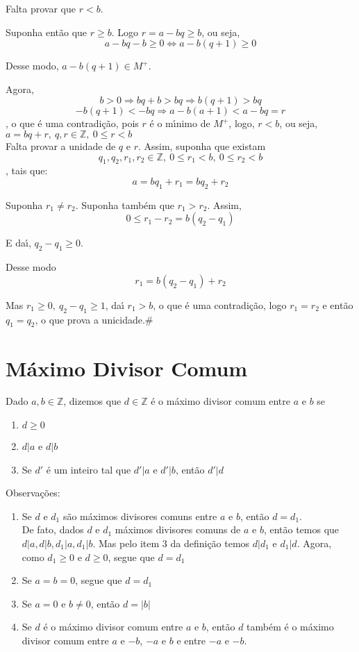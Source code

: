 Falta provar que $r<b$.

Suponha ent{\~a}o que $r\geq b$. Logo $r=a-bq\geq b$, ou seja,\[a-bq-b\geq 0\Leftrightarrow a-b(q+1)\geq 0\]

Desse modo, $a-b(q+1)\in M^{+}$.

Agora, \[b>0\Rightarrow bq+b>bq\Rightarrow b(q+1)>bq\] \[-b(q+1)<-bq\Rightarrow a-b(a+1)<a-bq=r\], o que {\'e} uma contradi{\c c}{\~a}o, pois $r$ {\'e} o m{\'\i}nimo de $M^{+}$, logo, $r<b$, ou seja, $a=bq+r,\ q,r\in\mathbb{Z},\ 0\leq r<b$\\

Falta provar a unidade de $q$ e $r$. Assim, suponha que existam \[q_{1},q_{2},r_{1},r_{2}\in\mathbb{Z},\ 0\leq r_{1}<b,\ 0\leq r_{2}<b\], tais que:
\[a=bq_{1}+r_{1}=bq_{2}+r_{2}\]

Suponha $r_{1}\neq r_{2}$. Suponha tamb{\'e}m que $r_{1}>r_{2}$. Assim, \[0\leq r_{1}-r_{2}=b(q_{2}-q_{1})\]

E da{\'\i}, $q_{2}-q_{1}\geq 0$.

Desse modo \[r_{1}=b(q_{2}-q_{1})+r_{2}\]

Mas $r_{1}\geq 0,\ q_{2}-q_{1}\geq 1$, da{\'\i} $r_{1}>b$, o que {\'e} uma contradi{\c c}{\~a}o, logo $r_{1}=r_{2}$ e ent{\~a}o $q_{1}=q_{2}$, o que prova a unicidade.\#

\section{M{\'a}ximo Divisor Comum}

\begin{definicao} Dado $a,b\in\mathbb{Z}$, dizemos que $d\in\mathbb{Z}$ {\'e} o m{\'a}ximo divisor comum entre $a$ e $b$ se
\begin{enumerate}
\item $d\geq 0$
\item $d|a$ e $d|b$
\item Se $d'$ {\'e} um inteiro tal que $d'|a$ e $d'|b$, ent{\~a}o $d'|d$ %
\end{enumerate}
\end{definicao}

Observa{\c c}{\~o}es:
\begin{enumerate}
\item Se $d$ e $d_{1}$ s{\~a}o m{\'a}ximos divisores comuns entre $a$ e $b$, ent{\~a}o $d=d_{1}$.\\

De fato, dados $d$ e $d_{1}$ m{\'a}ximos divisores comuns de $a$ e $b$, ent{\~a}o temos que $d|a,d|b,d_{1}|a,d_{1}|b$. Mas pelo item 3 da defini{\c c}{\~a}o temos $d|d_{1}$ e $d_{1}|d$. Agora, como $d_{1}\geq 0$ e $d\geq 0$, segue que $d=d_{1}$
\item Se $a=b=0$, segue que $d=d_{1}$ %
\item Se $a=0$ e $b\neq 0$, ent{\~a}o $d=|b|$
\item Se $d$ {\'e} o m{\'a}ximo divisor comum entre $a$ e $b$, ent{\~a}o $d$ tamb{\'e}m {\'e} o m{\'a}ximo divisor comum entre $a$ e $-b$, $-a$ e $b$ e entre $-a$ e $-b$.
\end{enumerate}


